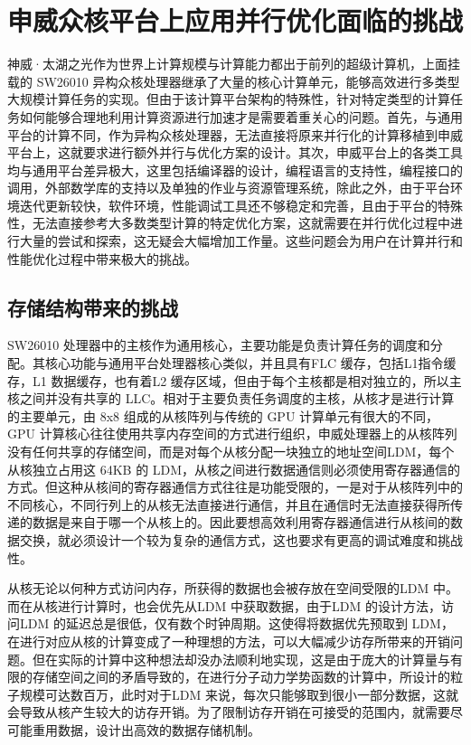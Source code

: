 \section{申威众核平台上应用并行优化面临的挑战}
神威·太湖之光作为世界上计算规模与计算能力都出于前列的超级计算机，上面挂载的 SW26010 异构众核处理器继承了大量的核心计算单元，能够高效进行多类型大规模计算任务的实现。但由于该计算平台架构的特殊性，针对特定类型的计算任务如何能够合理地利用计算资源进行加速才是需要着重关心的问题。首先，与通用平台的计算不同，作为异构众核处理器，无法直接将原来并行化的计算移植到申威平台上，这就要求进行额外并行与优化方案的设计。其次，申威平台上的各类工具均与通用平台差异极大，这里包括编译器的设计，编程语言的支持性，编程接口的调用，外部数学库的支持以及单独的作业与资源管理系统，除此之外，由于平台环境迭代更新较快，软件环境，性能调试工具还不够稳定和完善，且由于平台的特殊性，无法直接参考大多数类型计算的特定优化方案，这就需要在并行优化过程中进行大量的尝试和探索，这无疑会大幅增加工作量。这些问题会为用户在计算并行和性能优化过程中带来极大的挑战。

\subsection{存储结构带来的挑战}
SW26010 处理器中的主核作为通用核心，主要功能是负责计算任务的调度和分配。其核心功能与通用平台处理器核心类似，并且具有FLC 缓存，包括L1指令缓存，L1 数据缓存，也有着L2 缓存区域，但由于每个主核都是相对独立的，所以主核之间并没有共享的 LLC。相对于主要负责任务调度的主核，从核才是进行计算的主要单元，由 8x8 组成的从核阵列与传统的 GPU 计算单元有很大的不同，GPU 计算核心往往使用共享内存空间的方式进行组织，申威处理器上的从核阵列没有任何共享的存储空间，而是对每个从核分配一块独立的地址空间LDM，每个从核独立占用这 64KB 的 LDM，从核之间进行数据通信则必须使用寄存器通信的方式。但这种从核间的寄存器通信方式往往是功能受限的，一是对于从核阵列中的不同核心，不同行列上的从核无法直接进行通信，并且在通信时无法直接获得所传递的数据是来自于哪一个从核上的。因此要想高效利用寄存器通信进行从核间的数据交换，就必须设计一个较为复杂的通信方式，这也要求有更高的调试难度和挑战性。

从核无论以何种方式访问内存，所获得的数据也会被存放在空间受限的LDM 中。而在从核进行计算时，也会优先从LDM 中获取数据，由于LDM 的设计方法，访问LDM 的延迟总是很低，仅有数个时钟周期。这使得将数据优先预取到 LDM，在进行对应从核的计算变成了一种理想的方法，可以大幅减少访存所带来的开销问题。但在实际的计算中这种想法却没办法顺利地实现，这是由于庞大的计算量与有限的存储空间之间的矛盾导致的，在进行分子动力学势函数的计算中，所设计的粒子规模可达数百万，此时对于LDM 来说，每次只能够取到很小一部分数据，这就会导致从核产生较大的访存开销。为了限制访存开销在可接受的范围内，就需要尽可能重用数据，设计出高效的数据存储机制。

